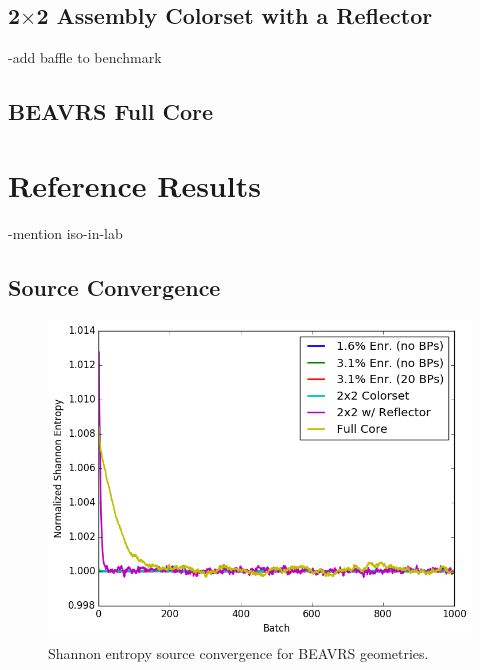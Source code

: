 \subsection{2$\times$2 Assembly Colorset with a Reflector}
-add baffle to benchmark

\subsection{BEAVRS Full Core}


\section{Reference Results}
\label{sec:chap7-ref-results}

-mention iso-in-lab

\subsection{Source Convergence}
\label{subsec:chap7-src-converge}

\begin{figure}[h!]
  \centering
  \includegraphics[width=0.9\linewidth]{figures/benchmarks/entropy/entropy-all}
\caption[Shannon entropy source convergence for BEAVRS geometries]{Shannon entropy source convergence for BEAVRS geometries.}
\label{fig:chap7-entropy}
\end{figure}



